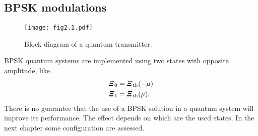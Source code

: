     \subsection{BPSK modulations}
        \begin{figure}[t]
            \texttt{[image: fig2.1.pdf]}
            \caption{Block diagram of a quantum transmitter.}
            \label{fig:2.1}
        \end{figure}
        BPSK quantum systems are implemented using two states with opposite amplitude, like
        \begin{equation}\begin{split}
            \Operator{\varXi}_0 &= \Operator{\varXi}_{\mathrm{th}}(-\mu)\\
            \Operator{\varXi}_1 &= \Operator{\varXi}_{\mathrm{th}}(\mu).
            \label{eq:2.1.2}
        \end{split}\end{equation}
        There is no guarantee that the use of a BPSK solution in  a quantum system will 
        improve its performance. The effect depends on which are the used states. In the next chapter some 
        configuration are assessed.

